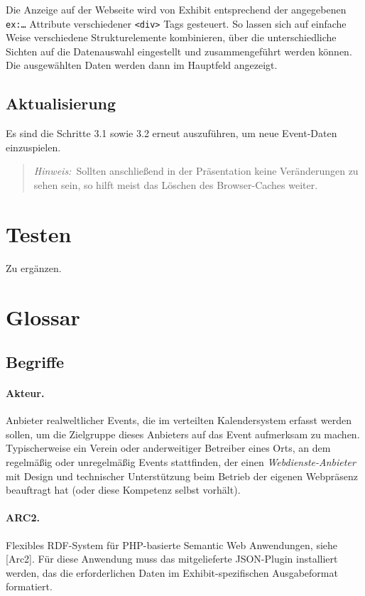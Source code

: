 \documentclass[11pt,a4paper]{article}
\begin{document}
Die Anzeige auf der Webseite wird von Exhibit entsprechend der angegebenen
\texttt{ex:\ldots} Attribute verschiedener \texttt{<div>} Tags gesteuert.  So
lassen sich auf einfache Weise verschiedene Strukturelemente kombinieren, über
die unterschiedliche Sichten auf die Datenauswahl eingestellt und
zusammengeführt werden können.  Die ausgewählten Daten werden dann im
Hauptfeld angezeigt.

\subsection{Aktualisierung}
Es sind die Schritte 3.1 sowie 3.2 erneut auszuführen, um neue Event-Daten
einzuspielen.
\begin{quote}
  \emph{Hinweis:}\ Sollten anschließend in der Präsentation keine
  Veränderungen zu sehen sein, so hilft meist das {Löschen des Browser-Caches}
  weiter.
\end{quote}
\section{Testen}

Zu ergänzen.

\section{Glossar}

\subsection{Begriffe}

\paragraph{Akteur.} 
Anbieter realweltlicher Events, die im verteilten Kalendersystem erfasst
werden sollen, um die Zielgruppe dieses Anbieters auf das Event aufmerksam zu
machen.  Typischerweise ein Verein oder anderweitiger Betreiber eines Orts, an
dem regelmäßig oder unregelmäßig Events stattfinden, der einen
\emph{Webdienste-Anbieter} mit Design und technischer Unterstüt\-zung beim
Betrieb der eigenen Webpräsenz beauftragt hat (oder diese Kompetenz selbst
vorhält).

\paragraph{ARC2.} 
Flexibles RDF-System für PHP-basierte Semantic Web Anwendungen, siehe [Arc2].
Für diese Anwendung muss das mitgelieferte JSON-Plugin installiert werden, das
die erforderlichen Daten im Exhibit-spezifischen Ausgabeformat formatiert. 
\end{document}
